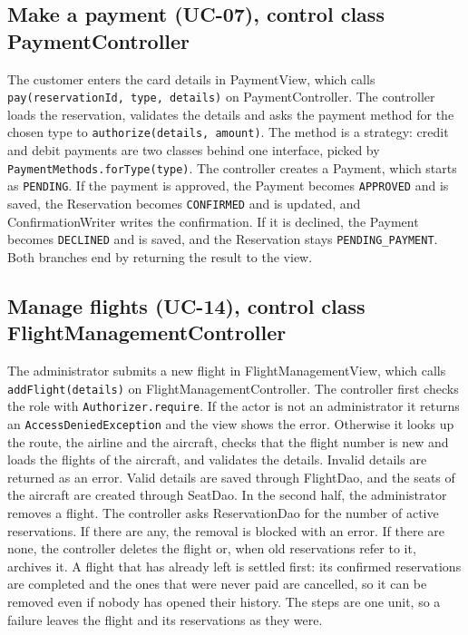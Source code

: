 
\subsection*{Make a payment (UC-07), control class PaymentController}

The customer enters the card details in PaymentView, which calls
\texttt{pay(reservationId, type, details)} on PaymentController. The controller
loads the reservation, validates the details and asks the payment method for
the chosen type to \texttt{authorize(details, amount)}. The method is a
strategy: credit and debit payments are two classes behind one interface, picked
by \texttt{PaymentMethods.forType(type)}. The controller creates a Payment,
which starts as \texttt{PENDING}. If the payment is approved, the Payment becomes
\texttt{APPROVED} and is saved, the Reservation becomes \texttt{CONFIRMED} and is
updated, and ConfirmationWriter writes the confirmation. If it is declined, the
Payment becomes \texttt{DECLINED} and is saved, and the Reservation stays
\texttt{PENDING\_PAYMENT}. Both branches end by returning the result to the view.


\subsection*{Manage flights (UC-14), control class FlightManagementController}

The administrator submits a new flight in FlightManagementView, which calls
\texttt{addFlight(details)} on FlightManagementController. The controller first
checks the role with \texttt{Authorizer.require}. If the actor is not an
administrator it returns an \texttt{AccessDeniedException} and the view shows
the error. Otherwise it looks up the route, the airline and the aircraft,
checks that the flight number is new and loads the flights of the aircraft, and
validates the details. Invalid details are returned as an error. Valid details
are saved through FlightDao, and the seats of the aircraft are created through
SeatDao. In the second half, the administrator removes a flight. The controller
asks ReservationDao for the number of active reservations. If there are any,
the removal is blocked with an error. If there are none, the controller deletes
the flight or, when old reservations refer to it, archives it. A flight that has already
left is settled first: its confirmed reservations are completed and the ones that were
never paid are cancelled, so it can be removed even if nobody has opened their history.
The steps are one unit, so a failure leaves the flight and its reservations as they were.

